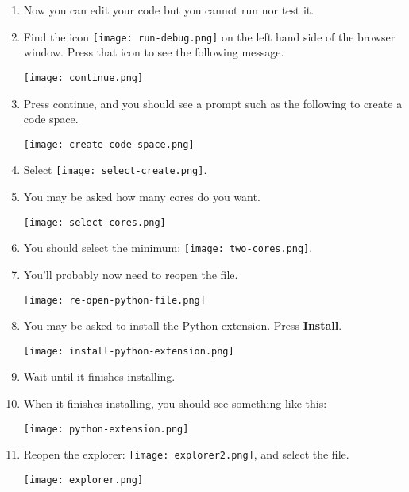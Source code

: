 \begin{enumerate}

\item Now you can edit your code but you cannot run nor test it.

\item Find the icon \texttt{[image: run-debug.png]} on the left hand side of the browser window.   Press that icon to see the following message.

\noindent\texttt{[image: continue.png]}

\item Press continue, and you should see a prompt such as the following to create a code space.   

\noindent\texttt{[image: create-code-space.png]}

\item Select \texttt{[image: select-create.png]}.

\item You may be asked how many cores do you want.

\noindent\texttt{[image: select-cores.png]}

\item You should select the minimum: \texttt{[image: two-cores.png]}.

\item You'll probably now need to reopen the  file.

\noindent\texttt{[image: re-open-python-file.png]}

\item You may be asked to install the Python extension.  Press \textbf{Install}.

\noindent\texttt{[image: install-python-extension.png]}


\item Wait until it finishes installing.
  

\item When it finishes installing, you should see something like this:

\noindent\texttt{[image: python-extension.png]}

\item Reopen the explorer: \texttt{[image: explorer2.png]}, and select the  file.

\noindent\texttt{[image: explorer.png]}
\end{enumerate}

